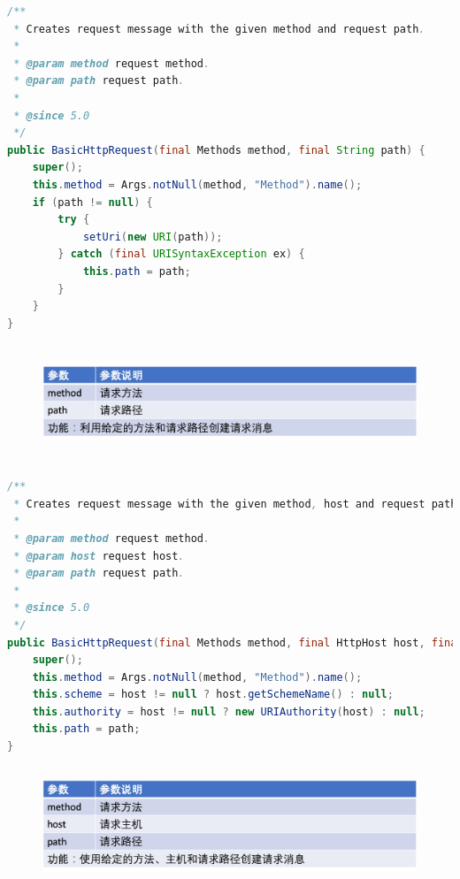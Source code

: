 \documentclass{article}
\begin{document}
	\begin{lstlisting}[language={java}]
/**
 * Creates request message with the given method and request path.
 *
 * @param method request method.
 * @param path request path.
 *
 * @since 5.0
 */
public BasicHttpRequest(final Methods method, final String path) {
    super();
    this.method = Args.notNull(method, "Method").name();
    if (path != null) {
        try {
            setUri(new URI(path));
        } catch (final URISyntaxException ex) {
            this.path = path;
        }
    }
}
	\end{lstlisting}
	\begin{figure}[H]
		\centering
		\includegraphics[height = 3.5cm, width = 18cm]{pics/18_Request_table_1_4.png}	
	\end{figure}

	\begin{lstlisting}[language={java}]
/**
 * Creates request message with the given method, host and request path.
 *
 * @param method request method.
 * @param host request host.
 * @param path request path.
 *
 * @since 5.0
 */
public BasicHttpRequest(final Methods method, final HttpHost host, final String path) {
    super();
    this.method = Args.notNull(method, "Method").name();
    this.scheme = host != null ? host.getSchemeName() : null;
    this.authority = host != null ? new URIAuthority(host) : null;
    this.path = path;
}

	\end{lstlisting}
	\begin{figure}[H]
		\centering
		\includegraphics[height = 3.5cm, width = 18cm]{pics/19_Request_table_2_5.png}	
	\end{figure}
\end{document}
